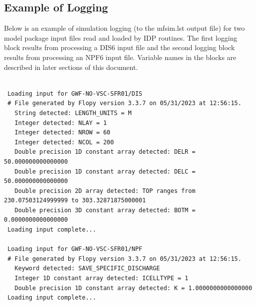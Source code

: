 \subsection{Example of Logging}

Below is an example of simulation logging (to the mfsim.lst output file) for two model package input files read and loaded by IDP routines.  The first logging block results from processing a DIS6 input file and the second logging block results from processing an NPF6 input file.  Variable names in the blocks are described in later sections of this document.

\small
\begin{lstlisting}[style=modeloutput]

 Loading input for GWF-NO-VSC-SFR01/DIS
 # File generated by Flopy version 3.3.7 on 05/31/2023 at 12:56:15.
   String detected: LENGTH_UNITS = M
   Integer detected: NLAY = 1
   Integer detected: NROW = 60
   Integer detected: NCOL = 200
   Double precision 1D constant array detected: DELR = 50.000000000000000
   Double precision 1D constant array detected: DELC = 50.000000000000000
   Double precision 2D array detected: TOP ranges from 230.07503124999999 to 303.32871875000001
   Double precision 3D constant array detected: BOTM = 0.0000000000000000
 Loading input complete...

 Loading input for GWF-NO-VSC-SFR01/NPF
 # File generated by Flopy version 3.3.7 on 05/31/2023 at 12:56:15.
   Keyword detected: SAVE_SPECIFIC_DISCHARGE
   Integer 1D constant array detected: ICELLTYPE = 1
   Double precision 1D constant array detected: K = 1.0000000000000000
 Loading input complete...
\end{lstlisting}
